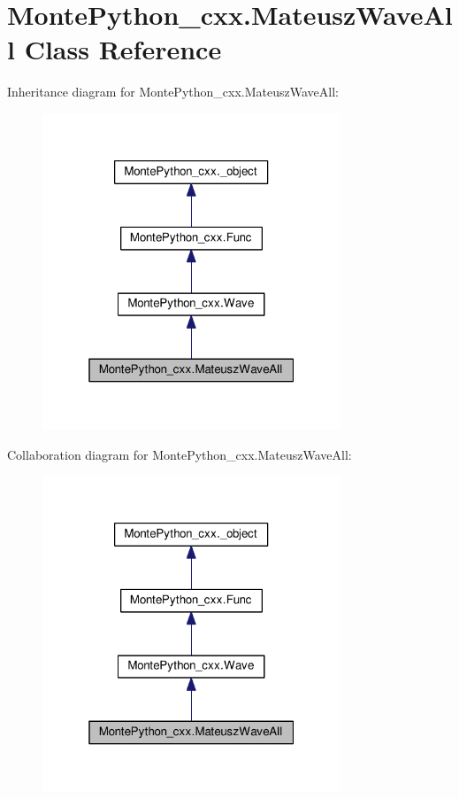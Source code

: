 \hypertarget{classMontePython__cxx_1_1MateuszWaveAll}{}\section{Monte\+Python\+\_\+cxx.\+Mateusz\+Wave\+All Class Reference}
\label{classMontePython__cxx_1_1MateuszWaveAll}


Inheritance diagram for Monte\+Python\+\_\+cxx.\+Mateusz\+Wave\+All\+:
\nopagebreak
\begin{figure}[H]
\begin{center}
\leavevmode
\includegraphics[width=253pt]{classMontePython__cxx_1_1MateuszWaveAll__inherit__graph}
\end{center}
\end{figure}


Collaboration diagram for Monte\+Python\+\_\+cxx.\+Mateusz\+Wave\+All\+:
\nopagebreak
\begin{figure}[H]
\begin{center}
\leavevmode
\includegraphics[width=253pt]{classMontePython__cxx_1_1MateuszWaveAll__coll__graph}
\end{center}
\end{figure}
